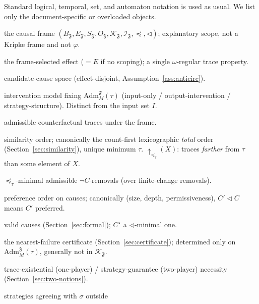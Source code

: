 \documentclass[11pt]{article}
\theoremstyle{remark}
\newcommand{\Close}{\mathrm{Close}}
\newcommand{\Frame}{\mathfrak{F}}
\newcommand{\Adm}{\mathrm{Adm}}
\begin{document}
Standard logical, temporal, set, and automaton notation is used as usual. We list
only the document-specific or overloaded objects.
\begin{description}[leftmargin=2.6cm,style=nextline]
  \item[\(\Frame\)] the causal frame
        \((B_{\Frame},E_{\Frame},S_{\Frame},O_{\Frame},\mathcal{K}_{\Frame},
        \mathcal{I}_{\Frame},\preceq,\triangleleft)\); explanatory scope, not a
        Kripke frame and not \(\varphi\).
  \item[\(E_{\Frame}\)] the frame-selected effect (\(=E\) if no scoping); a single
        \(\omega\)-regular trace property.
  \item[\(\mathcal{K}_{\Frame}\)] candidate-cause space (effect-disjoint,
        Assumption~\ref{ass:anticirc}).
  \item[\(\mathcal{I}_{\Frame}\)] intervention model fixing
        \(\Adm_M^{\Frame}(\tau)\) (input-only / output-intervention /
        strategy-structure). Distinct from the input set \(I\).
  \item[\(\Adm_M^{\Frame}(\tau)\)] admissible counterfactual traces under the
        frame.
  \item[\(\preceq_\tau\)] similarity order; canonically the count-first
        lexicographic \emph{total} order (Section~\ref{sec:similarity}), unique
        minimum \(\tau\). \(\uparrow_{\preceq_\tau}(X)\): traces \emph{farther}
        from \(\tau\) than some element of \(X\).
  \item[\(\Close_{\tau,M}^{\Frame}(\neg C)\)] \(\preceq_\tau\)-minimal admissible
        \(\neg C\)-removals (over finite-change removals).
  \item[\(\triangleleft\)] preference order on causes; canonically
        (size, depth, permissiveness), \(C'\triangleleft C\) means \(C'\) preferred.
  \item[\(\mathsf{Causes}_{M,\Frame,\tau}(E_{\Frame})\)] valid causes
        (Section~\ref{sec:formal}); \(C^\star\) a \(\triangleleft\)-minimal one.
  \item[\(C^{\flat}\)] the nearest-failure certificate
        (Section~\ref{sec:certificate}); determined only on
        \(\Adm_M^{\Frame}(\tau)\), generally not in \(\mathcal{K}_{\Frame}\).
  \item[N1 / N2] trace-existential (one-player) / strategy-guarantee (two-player)
        necessity (Section~\ref{sec:two-notions}).
  \item[\(\Sigma_{\Frame},V_{\Frame}\)] strategies agreeing with \(\sigma\) outside

\end{description}
\end{document}
